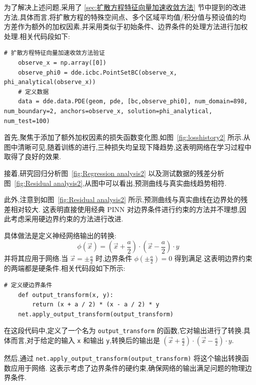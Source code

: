 \documentclass{Sichuan Normal University}
\begin{document}
    为了解决上述问题,采用了 \ref{sec:扩散方程特征向量加速收敛方法} 节中提到的改进方法,具体而言,将扩散方程的特殊空间点、多个区域平均值/积分值与预设值的均方差作为额外的加权因素,并采用类似于初始条件、边界条件的处理方法进行加权处理.相关代码段如下:

\newpage
\begin{lstlisting}[style=python,basicstyle=\footnotesize\fontspec{Courier New},]  
    # 扩散方程特征向量加速收敛方法验证
    observe_x = np.array([0])
    observe_phi0 = dde.icbc.PointSetBC(observe_x, phi_analytical(observe_x))
    # 定义数据
    data = dde.data.PDE(geom, pde, [bc,observe_phi0], num_domain=898, num_boundary=2, anchors=observe_x, solution=phi_analytical, num_test=100)
\end{lstlisting}
首先,聚焦于添加了额外加权因素的损失函数变化图,如图~\ref{fig:losshistory2} 所示.从图中清晰可见,随着训练的进行,三种损失均呈现下降趋势,这表明网络在学习过程中取得了良好的效果.

接着,研究回归分析图~\ref{fig:Regression analysis2} 以及测试数据的残差分析图~\ref{fig:Residual analysis2},从图中可以看出,预测曲线与真实曲线趋势相符.

此外,注意到如图~\ref{fig:Residual analysis2} 所示,预测曲线与真实曲线在边界处的残差相对较大.
这表明直接使用经典 PINN 对边界条件进行约束的方法并不理想,因此考虑采用硬边界约束的方法进行改进.

具体做法是定义神经网络输出的转换:
\begin{equation}
    \phi(\vec{x})=(\vec{x}+\frac{a}{2}) \cdot(\vec{x}-\frac{a}{2}) \cdot y
\end{equation}
并将其应用于网络.当 $\vec{x}=\pm \frac{a}{2}$ 时,边界条件 $\phi(\pm \frac{a}{2})=0$ 得到满足.这表明边界约束的两端都是硬条件.相关代码段如下所示:

\begin{lstlisting}[style=python,basicstyle=\footnotesize\fontspec{Courier New},]  
    # 定义硬边界条件
    def output_transform(x, y):
        return (x + a / 2) * (x - a / 2) * y
    net.apply_output_transform(output_transform)
\end{lstlisting}

在这段代码中,定义了一个名为 \texttt{output\_transform} 的函数,它对输出进行了转换.具体而言,对于给定的输入 \texttt{x} 和输出 \texttt{y},转换后的输出是 $(\vec{x}+\frac{a}{2}) \cdot(\vec{x}-\frac{a}{2}) \cdot y$.

然后,通过 \texttt{net.apply\_output\_transform(output\_transform)} 将这个输出转换函数应用于网络.
这表示考虑了边界条件的硬约束,确保网络的输出满足问题的物理边界条件.
\end{document}
